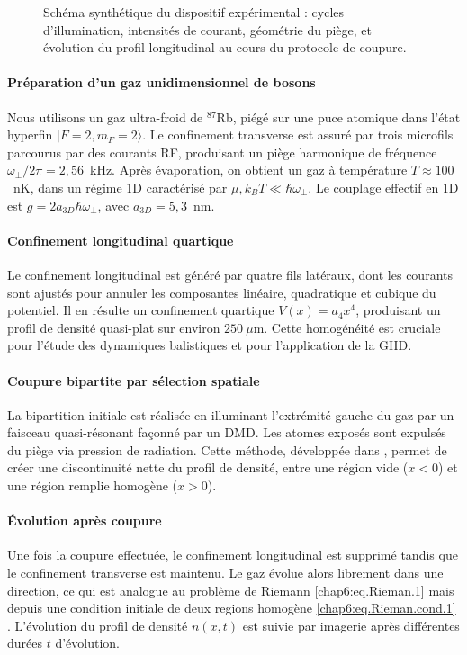 \begin{figure}[!htb]
\caption{Schéma synthétique du dispositif expérimental : cycles d’illumination, intensités de courant, géométrie du piège, et évolution du profil longitudinal au cours du protocole de coupure.}
\label{fig:setup}
\end{figure}

\paragraph{Préparation d’un gaz unidimensionnel de bosons} 
Nous utilisons un gaz ultra-froid de $^{87}$Rb, piégé sur une puce atomique dans l’état hyperfin $|F=2,m_F=2\rangle$. Le confinement transverse est assuré par trois microfils parcourus par des courants RF, produisant un piège harmonique de fréquence $\omega_\perp/2\pi = 2{,}56$~kHz. Après évaporation, on obtient un gaz à température $T \approx 100$~nK, dans un régime 1D caractérisé par $\mu, k_B T \ll \hbar \omega_\perp$. Le couplage effectif en 1D est $g = 2 a_{3D} \hbar \omega_\perp$, avec $a_{3D} = 5{,}3$~nm.

\paragraph{Confinement longitudinal quartique}
Le confinement longitudinal est généré par quatre fils latéraux, dont les courants sont ajustés pour annuler les composantes linéaire, quadratique et cubique du potentiel. Il en résulte un confinement quartique $V(x) = a_4 x^4$, produisant un profil de densité quasi-plat sur environ $250~\mu$m. Cette homogénéité est cruciale pour l’étude des dynamiques balistiques et pour l’application de la GHD.

\paragraph{Coupure bipartite par sélection spatiale}
La bipartition initiale est réalisée en illuminant l’extrémité gauche du gaz par un faisceau quasi-résonant façonné par un DMD. Les atomes exposés sont expulsés du piège via pression de radiation. Cette méthode, développée dans \cite{PhysRevLett.133.113402}, permet de créer une discontinuité nette du profil de densité, entre une région vide ($x<0$) et une région remplie homogène ($x>0$). %

\paragraph{Évolution après coupure}
Une fois la coupure effectuée, le confinement longitudinal est supprimé tandis que le confinement transverse est maintenu. Le gaz évolue alors librement dans une direction, ce qui est analogue au problème de Riemann \eqref{chap6:eq.Rieman.1} mais depuis une condition initiale de deux regions homogène \eqref{chap6:eq.Rieman.cond.1} . L’évolution du profil de densité $n(x,t)$ est suivie par imagerie après différentes durées $t$ d’évolution.

